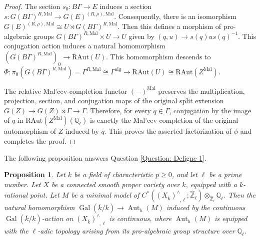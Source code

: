 \documentclass[11pt]{amsart}
\newtheorem{proposition}[theorem]{Proposition}
\theoremstyle{definition}
\numberwithin{equation}{section}
\numberwithin{equation}{section}
\newcommand\QQ{\mathbb{Q}}
\newcommand\ZZ{\mathbb{Z}}
\DeclareMathOperator{\Aut}{Aut}
\DeclareMathOperator{\et}{\acute{e}t}
\DeclareMathOperator{\Gal}{Gal}
\begin{document}
\begin{proof}
The section $s_0:B\Gamma\rightarrow E$ induces a section $s:G(B\Gamma)^{R,\mathrm{Mal}}\rightarrow G(E)^{(R,\rho),\mathrm{Mal}}$. Consequently, there is an isomorphism $G(E)^{(R,\rho),\mathrm{Mal}}\cong U\rtimes G(B\Gamma)^{R,\mathrm{Mal}}$. Then this defines a morphism of pro-algebraic groups $G(B\Gamma)^{R,\mathrm{Mal}}\times U\rightarrow U$ given by $(q,u)\rightarrow s(q)us(q)^{-1}$. This conjugation action induces a natural homomorphism $(G(B\Gamma)^{R,\mathrm{Mal}})_0\rightarrow \mathrm{RAut}(U)$. This homomorphism descends to $\Phi:\pi_0(G(B\Gamma)^{R,\mathrm{Mal}})=\Gamma^{R,\mathrm{Mal}}\cong \Gamma^{\mathrm{alg}}\rightarrow \mathrm{RAut}(U)\cong \mathrm{RAut}(Z^{\mathrm{Mal}})$. 

The relative Mal'cev-completion functor $(-)^{\mathrm{Mal}}$ preserves the multiplication, projection, section, and conjugation maps of the original split extension $G(Z)\rightarrow G(Z)\rtimes \Gamma\rightarrow \Gamma$. Therefore, for every $q\in \Gamma$, conjugation by the image of $q$ in $\mathrm{RAut}(Z^{\mathrm{Mal}})(\QQ_{\ell})$ is exactly the Mal'cev completion of the original automorphism of $Z$ induced by $q$. This proves the asserted factorization of $\phi$ and completes the proof.
\end{proof}

The following proposition answers Question \ref{Question: Deligne 1}.

\begin{proposition}\label{Prop: continuity of Galois action on automorphism group of minimal model}
Let $k$ be a field of characteristic $p\geq 0$, and let $\ell$ be a prime number. Let $X$ be a connected smooth proper variety over $k$, equipped with a $k$-rational point. Let $M$ be a minimal model of $C^*((X_{\overline{k}})^{\wedge}_{\et,\ell};\widehat{\ZZ}_{\ell})\otimes_{\widehat{\ZZ}_{\ell}}\QQ_{\ell}$. Then the natural homomorphism $\Gal(\overline{k}/k)\rightarrow \Aut_h(M)$ induced by the continuous $\Gal(\overline{k}/k)$-action on $(X_{\overline{k}})^{\wedge}_{\et,\ell}$ is continuous, where $\Aut_h(M)$ is equipped with the $\ell$-adic topology arising from its pro-algebraic group structure over $\QQ_{\ell}$.  
\end{proposition}
\end{document}
